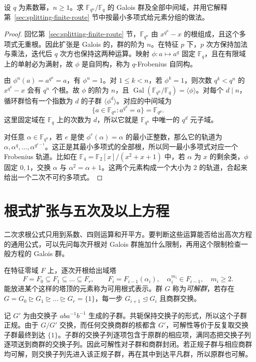 \documentclass[lang=cn,a4paper,fontset=none,zihao=false,10pt,openany,twoside]{beautybook}
\numberwithin{algorithm}{chapter}
\begin{document}
\begin{example}\label{ex:galois-frobenius}
设 $q$ 为素数幂，$n\ge1$。求 $\mathbb F_{q^n}/\mathbb F_q$ 的 Galois 群及全部中间域，并用它解释第~\ref{sec:splitting-finite-route} 节中按最小多项式给元素分组的做法。
\end{example}
\begin{proof}
回忆第~\ref{sec:splitting-finite-route} 节，$\mathbb F_{q^n}$ 由 $x^{q^n}-x$ 的根组成，且这个多项式无重根。因此扩张是 Galois 的，群的阶为 $n$。在特征 $p$ 下，$p$ 次方保持加法与乘法，迭代后 $q$ 次方也保持这两种运算。映射 $\phi:a\mapsto a^q$ 固定 $\mathbb F_q$，且在有限域上的单射必为满射，故 $\phi$ 是自同构，称为 $q$-Frobenius 自同构。

由 $\phi^n(a)=a^{q^n}=a$，有 $\phi^n=1$。对 $1\le k<n$，若 $\phi^k=1$，则次数 $q^k<q^n$ 的 $x^{q^k}-x$ 会有 $q^n$ 个根。故 $\phi$ 的阶为 $n$，且 $\operatorname{Gal}(\mathbb F_{q^n}/\mathbb F_q)=\langle\phi\rangle$。对每个 $d\mid n$，循环群恰有一个指数为 $d$ 的子群 $\langle\phi^d\rangle$。对应的中间域为
\[
 \{a\in\mathbb F_{q^n}:a^{q^d}=a\}=\mathbb F_{q^d}.
\]
这里固定域在 $\mathbb F_q$ 上的次数为 $d$，所以它就是 $\mathbb F_{q^n}$ 中唯一的 $q^d$ 元子域。

对任意 $\alpha\in\mathbb F_{q^n}$，若 $e$ 是使 $\phi^e(\alpha)=\alpha$ 的最小正整数，那么它的轨道为 $\alpha,\alpha^q,\dots,\alpha^{q^{e-1}}$。这正是其最小多项式的全部根，所以同一最小多项式对应一个 Frobenius 轨道。比如在 $\mathbb F_4=\mathbb F_2[x]/(x^2+x+1)$ 中，若 $\alpha$ 为 $x$ 的剩余类，$\phi$ 固定 $0,1$，交换 $\alpha$ 与 $\alpha^2=\alpha+1$。这两个元素构成一个大小为 $2$ 的轨道，合起来给出一个二次不可约多项式。
\end{proof}

\section{根式扩张与五次及以上方程}\label{sec:galois-radicals}

二次求根公式只用到系数、四则运算和开平方。要判断这些运算能否给出高次方程的通用公式，可以先问每次开根对 Galois 群施加什么限制，再用这个限制检查一般方程的 Galois 群。

\begin{definition}[根式塔与可解群]
在特征零域 $F$ 上，逐次开根给出域塔
\[
 F=F_0\subseteq F_1\subseteq\dots\subseteq F_r,\qquad
 F_i=F_{i-1}(\alpha_i),\quad \alpha_i^{m_i}\in F_{i-1},\quad m_i\ge2.
\]
能放进某个这样的塔顶的元素称为可用根式表示。群 $G$ 称为\emph{可解群}，若存在 $G=G_0\trianglerighteq G_1\trianglerighteq\dots\trianglerighteq G_r=\{1\}$，每一步 $G_{i+1}\trianglelefteq G_i$ 且商群交换。
\end{definition}
记 $G'$ 为由交换子 $aba^{-1}b^{-1}$ 生成的子群。共轭保持交换子的形式，所以这个子群正规。由于 $G/G'$ 交换，而任何交换商群的核都含 $G'$，可解性等价于反复取交换子群最终到达 $\{1\}$。子群的交换子列逐项包含于原群的相应项，满同态把交换子列逐项送到商群的交换子列。因此可解性对子群和商群封闭。若正规子群与相应商群均可解，则交换子列先进入该正规子群，再在其中到达平凡群，所以原群也可解。
\end{document}
